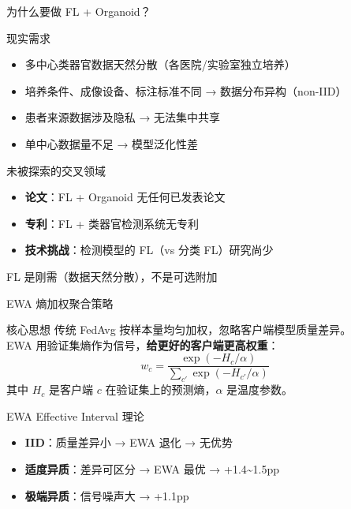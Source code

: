 \documentclass[aspectratio=169, 10pt]{beamer}
\begin{document}
\begin{frame}{为什么要做 FL + Organoid？}
  \begin{block}{现实需求}
    \begin{itemize}
      \item 多中心类器官数据天然分散（各医院/实验室独立培养）
      \item 培养条件、成像设备、标注标准不同 → 数据分布异构（non-IID）
      \item 患者来源数据涉及隐私 → 无法集中共享
      \item 单中心数据量不足 → 模型泛化性差
    \end{itemize}
  \end{block}
  \vspace{0em}
  \begin{block}{未被探索的交叉领域}
    \begin{itemize}
      \item \textbf{论文}：FL + Organoid 无任何已发表论文
      \item \textbf{专利}：FL + 类器官检测系统无专利
      \item \textbf{技术挑战}：检测模型的 FL（vs 分类 FL）研究尚少
    \end{itemize}
  \end{block}
  \vspace{0em}
  \centering\alert{FL 是刚需（数据天然分散），不是可选附加}
\end{frame}

\begin{frame}{EWA 熵加权聚合策略}
  \begin{block}{核心思想}
    传统 FedAvg 按样本量均匀加权，忽略客户端模型质量差异。\\
    EWA 用验证集熵作为信号，\textbf{给更好的客户端更高权重}：
    \[
      w_c = \frac{\exp(-H_c / \alpha)}{\sum_{c'} \exp(-H_{c'} / \alpha)}
    \]
    其中 $H_c$ 是客户端 $c$ 在验证集上的预测熵，$\alpha$ 是温度参数。
  \end{block}
  \vspace{0em}
  \begin{block}{EWA Effective Interval 理论}
    \begin{itemize}
      \item \textbf{IID}：质量差异小 → EWA 退化 → \alert{无优势}
      \item \textbf{适度异质}：差异可区分 → EWA 最优 → \alert{+1.4\textasciitilde 1.5pp}
      \item \textbf{极端异质}：信号噪声大 → \alert{+1.1pp}
    \end{itemize}
  \end{block}
\end{frame}
\end{document}
